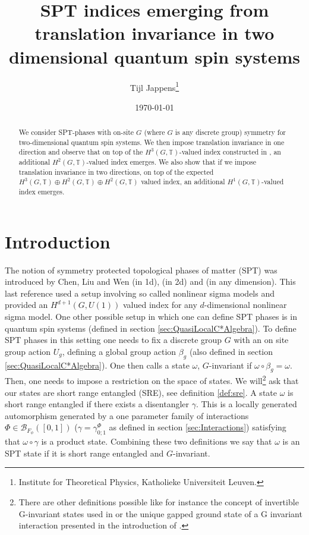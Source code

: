 \documentclass[12pt,a4paper,twoside]{article}
\title{SPT indices emerging from translation invariance in two dimensional quantum spin systems}
\author{Tijl Jappens\footnote{Institute for Theoretical Physics, Katholieke Universiteit Leuven.}}
\date{\today}
\newcommand{\BB}{\mathcal B}
\newcommand{\TT}{\mathbb T}
\theoremstyle{definition}
\numberwithin{equation}{section}
\begin{document}
\maketitle 
\begin{abstract}
	We consider SPT-phases with on-site $G$ (where $G$ is any discrete group) symmetry for two-dimensional quantum spin systems. We then impose translation invariance in one direction and observe that on top of the $H^3(G,\TT)$-valued index constructed in \cite{ogata2021h3gmathbb}, an additional $H^2(G,\TT)$-valued index emerges. We also show that if we impose translation invariance in two directions, on top of the expected $H^3(G,\TT)\oplus H^2(G,\TT)\oplus H^2(G,\TT)$ valued index, an additional $H^1(G,\TT)$-valued index emerges.
\end{abstract}
\section{Introduction}
The notion of symmetry protected topological phases of matter (SPT) was introduced by Chen, Liu and Wen \cite{Chen_2011} (in 1d), \cite{chen_gu_wen_2011} (in 2d) and \cite{Chen_2013} (in any dimension). This last reference used a setup involving so called nonlinear sigma models and provided an $H^{d+1}(G,U(1))$ valued index for any $d$-dimensional nonlinear sigma model. One other possible setup in which one can define SPT phases is in quantum spin systems (defined in section \ref{sec:QuasiLocalC*Algebra}). To define SPT phases in this setting one needs to fix a discrete group $G$ with an on site group action $U_g$, defining a global group action $\beta_g$ (also defined in section \ref{sec:QuasiLocalC*Algebra}). One then calls a state $\omega$, $G$-invariant if $\omega\circ\beta_g=\omega$. Then, one needs to impose a restriction on the space of states. We will\footnote{There are other definitions possible like for instance the concept of invertible G-invariant states used in \cite{kapustin2021classification} or the unique gapped ground state of a G invariant interaction presented in the introduction of \cite{ogata2021h3gmathbb}.} ask that our states are short range entangled (SRE), see definition \ref{def:sre}. A state $\omega$ is short range entangled if there exists a disentangler $\gamma$. This is a locally generated automorphism generated by a one parameter family of interactions $\Phi\in\BB_{F_\phi}([0,1])$ ($\gamma=\gamma_{0;1}^\Phi$ as defined in section \ref{sec:Interactions}) satisfying that $\omega\circ\gamma$ is a product state. Combining these two definitions we say that $\omega$ is an SPT state if it is short range entangled and $G$-invariant.
\end{document}
